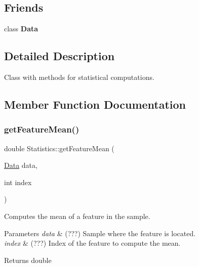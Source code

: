 \subsection*{Friends}
\begin{DoxyCompactItemize}
\item 
\mbox{\label{class_statistics_a242d9fdd7c3ba48097582a2662b6f48d}} 
class {\bfseries Data}
\end{DoxyCompactItemize}


\subsection{Detailed Description}
Class with methods for statistical computations. 

\subsection{Member Function Documentation}
\mbox{\label{class_statistics_a4201ed0f3f817591bcf18d8ba7bfc1e0}} 
\subsubsection{\texorpdfstring{get\+Feature\+Mean()}{getFeatureMean()}}
{\footnotesize\ttfamily double Statistics\+::get\+Feature\+Mean (\begin{DoxyParamCaption}\item[{\hyperlink{class_data}{Data}}]{data,  }\item[{int}]{index }\end{DoxyParamCaption})\hspace{0.3cm}{\ttfamily [static]}}



Computes the mean of a feature in the sample. 


\begin{DoxyParams}{Parameters}
{\em data} & (???) Sample where the feature is located. \\
\hline
{\em index} & (???) Index of the feature to compute the mean. \\
\hline
\end{DoxyParams}
\begin{DoxyReturn}{Returns}
double 
\end{DoxyReturn}
\mbox{\label{class_statistics_a4cd8cbff1c0b3cdf08adf6c7fc453251}} 
